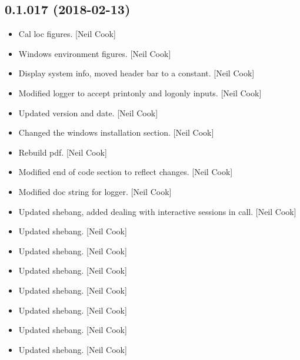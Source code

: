 \documentclass[a4paper,10pt,english]{report}
\begin{document}
\subsection{0.1.017 (2018-02-13)}
\label{\detokenize{misc/changelog:id487}}\begin{itemize}
\item {} 
Cal loc figures. {[}Neil Cook{]}

\item {} 
Windows environment figures. {[}Neil Cook{]}

\item {} 
Display system info, moved header bar to a constant. {[}Neil Cook{]}

\item {} 
Modified logger to accept printonly and logonly inputs. {[}Neil Cook{]}

\item {} 
Updated version and date. {[}Neil Cook{]}

\item {} 
Changed the windows installation section. {[}Neil Cook{]}

\item {} 
Rebuild pdf. {[}Neil Cook{]}

\item {} 
Modified end of code section to reflect changes. {[}Neil Cook{]}

\item {} 
Modified doc string for logger. {[}Neil Cook{]}

\item {} 
Updated shebang, added  dealing with interactive sessions
in  call. {[}Neil Cook{]}

\item {} 
Updated shebang. {[}Neil Cook{]}

\item {} 
Updated shebang. {[}Neil Cook{]}

\item {} 
Updated shebang. {[}Neil Cook{]}

\item {} 
Updated shebang. {[}Neil Cook{]}

\item {} 
Updated shebang. {[}Neil Cook{]}

\item {} 
Updated shebang. {[}Neil Cook{]}

\item {} 
Updated shebang. {[}Neil Cook{]}


\end{itemize}
\end{document}
